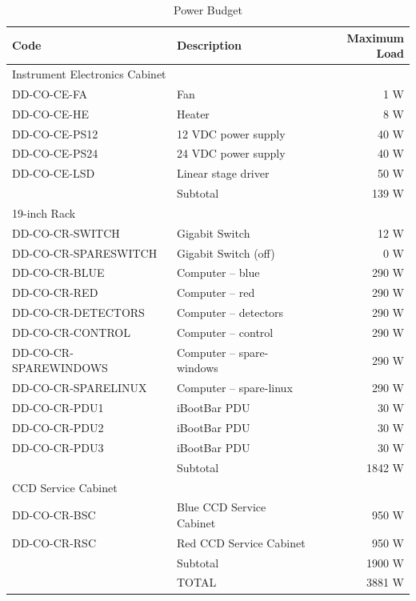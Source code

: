 \documentclass{article}
\begin{document}
\begin{table}[p]
\caption{Power Budget}
\label{table:power-budget}
\begin{center}
\small
\begin{tabular}{llr}
\hline
Code&Description&Maximum Load\\
\hline
\multicolumn{3}{l}{Instrument Electronics Cabinet}\\
\hline
DD-CO-CE-FA&Fan&1 W\\
DD-CO-CE-HE&Heater&8 W\\
DD-CO-CE-PS12&12 VDC power supply&40 W\\
DD-CO-CE-PS24&24 VDC power supply&40 W\\
DD-CO-CE-LSD&Linear stage driver&50 W\\
\hline
&Subtotal&139 W\\
\hline
\multicolumn{3}{l}{19-inch Rack}\\
\hline
DD-CO-CR-SWITCH&Gigabit Switch&12 W\\
DD-CO-CR-SPARESWITCH&Gigabit Switch (off)&0 W\\
DD-CO-CR-BLUE&Computer -- blue&290 W\\
DD-CO-CR-RED&Computer -- red&290 W\\
DD-CO-CR-DETECTORS&Computer -- detectors&290 W\\
DD-CO-CR-CONTROL&Computer -- control&290 W\\
DD-CO-CR-SPAREWINDOWS&Computer -- spare-windows&290 W\\
DD-CO-CR-SPARELINUX&Computer -- spare-linux&290 W\\
DD-CO-CR-PDU1&iBootBar PDU&30 W\\
DD-CO-CR-PDU2&iBootBar PDU&30 W\\
DD-CO-CR-PDU3&iBootBar PDU&30 W\\
\hline
&Subtotal&1842 W\\
\hline
\multicolumn{3}{l}{CCD Service Cabinet}\\
\hline
DD-CO-CR-BSC&Blue CCD Service Cabinet&950 W\\
DD-CO-CR-RSC&Red CCD Service Cabinet&950 W\\
\hline
&Subtotal&1900 W\\
\hline
&TOTAL&3881 W\\
\hline
\end{tabular}
\end{center}
\end{table}
\end{document}
